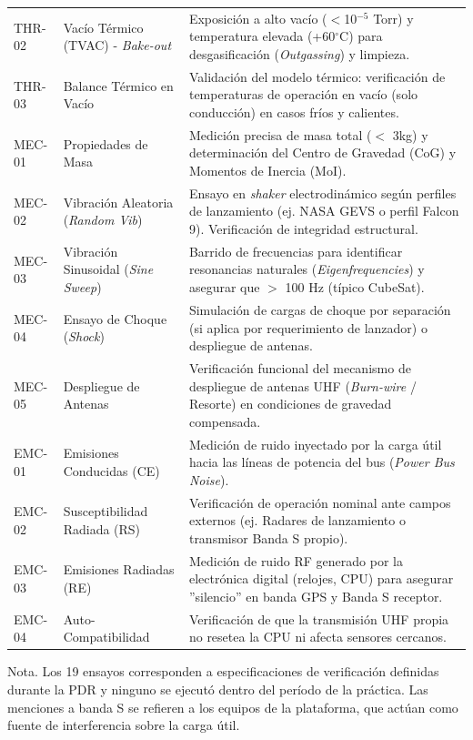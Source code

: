 \begin{footnotesize}
\begin{longtable}{|@{\hspace{4pt}}l >{\raggedright\arraybackslash}p{4.0cm} >{\raggedright\arraybackslash}p{8.6cm}@{\hspace{4pt}}|}
THR-02 & Vacío Térmico (TVAC) - \textit{Bake-out} & Exposición a alto vacío ($<$10$^{-5}$ Torr) y temperatura elevada (+60$^{\circ}$C) para desgasificación (\textit{Outgassing}) y limpieza. \\
THR-03 & Balance Térmico en Vacío & Validación del modelo térmico: verificación de temperaturas de operación en vacío (solo conducción) en casos fríos y calientes. \\
MEC-01 & Propiedades de Masa & Medición precisa de masa total ($<$ 3kg) y determinación del Centro de Gravedad (CoG) y Momentos de Inercia (MoI). \\
MEC-02 & Vibración Aleatoria (\textit{Random Vib}) & Ensayo en \textit{shaker} electrodinámico según perfiles de lanzamiento (ej. NASA GEVS o perfil Falcon 9). Verificación de integridad estructural. \\
MEC-03 & Vibración Sinusoidal (\textit{Sine Sweep}) & Barrido de frecuencias para identificar resonancias naturales (\textit{Eigenfrequencies}) y asegurar que $>$ 100 Hz (típico CubeSat). \\
MEC-04 & Ensayo de Choque (\textit{Shock}) & Simulación de cargas de choque por separación (si aplica por requerimiento de lanzador) o despliegue de antenas. \\
MEC-05 & Despliegue de Antenas & Verificación funcional del mecanismo de despliegue de antenas UHF (\textit{Burn-wire} / Resorte) en condiciones de gravedad compensada. \\
EMC-01 & Emisiones Conducidas (CE) & Medición de ruido inyectado por la carga útil hacia las líneas de potencia del bus (\textit{Power Bus Noise}). \\
EMC-02 & Susceptibilidad Radiada (RS) & Verificación de operación nominal ante campos externos (ej. Radares de lanzamiento o transmisor Banda S propio). \\
EMC-03 & Emisiones Radiadas (RE) & Medición de ruido RF generado por la electrónica digital (relojes, CPU) para asegurar ''silencio'' en banda GPS y Banda S receptor. \\
EMC-04 & Auto-Compatibilidad & Verificación de que la transmisión UHF propia no resetea la CPU ni afecta sensores cercanos. \\
\end{longtable}
\vspace{-1ex}\noindent\parbox{\textwidth}{\footnotesize Nota. Los 19 ensayos corresponden a especificaciones de verificación definidas durante la PDR y ninguno se ejecutó dentro del período de la práctica. Las menciones a banda S se refieren a los equipos de la plataforma, que actúan como fuente de interferencia sobre la carga útil.}
\end{footnotesize}
